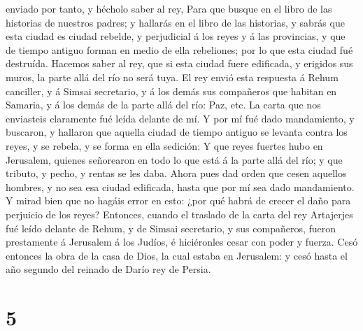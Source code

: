 enviado por tanto, y hécholo saber al rey,  Para que busque
en el libro de las historias de nuestros padres; y hallarás en el libro
de las historias, y sabrás que esta ciudad es ciudad rebelde, y
perjudicial á los reyes y á las provincias, y que de tiempo antiguo
forman en medio de ella rebeliones; por lo que esta ciudad fué
destruída.  Hacemos saber al rey, que si esta ciudad fuere
edificada, y erigidos sus muros, la parte allá del río no será tuya.
 El rey envió esta respuesta á Rehum canciller, y á Simsai
secretario, y á los demás sus compañeros que habitan en Samaria, y á los
demás de la parte allá del río: Paz, etc.  La carta que nos
enviasteis claramente fué leída delante de mí.  Y por mí
fué dado mandamiento, y buscaron, y hallaron que aquella ciudad de
tiempo antiguo se levanta contra los reyes, y se rebela, y se forma en
ella sedición:  Y que reyes fuertes hubo en Jerusalem,
quienes señorearon en todo lo que está á la parte allá del río; y que
tributo, y pecho, y rentas se les daba.  Ahora pues dad
orden que cesen aquellos hombres, y no sea esa ciudad edificada, hasta
que por mí sea dado mandamiento.  Y mirad bien que no
hagáis error en esto: ¿por qué habrá de crecer el daño para perjuicio de
los reyes?  Entonces, cuando el traslado de la carta del
rey Artajerjes fué leído delante de Rehum, y de Simsai secretario, y sus
compañeros, fueron prestamente á Jerusalem á los Judíos, é hiciéronles
cesar con poder y fuerza.  Cesó entonces la obra de la casa
de Dios, la cual estaba en Jerusalem: y cesó hasta el año segundo del
reinado de Darío rey de Persia.

\hypertarget{section-4}{%
\section{5}\label{section-4}}

